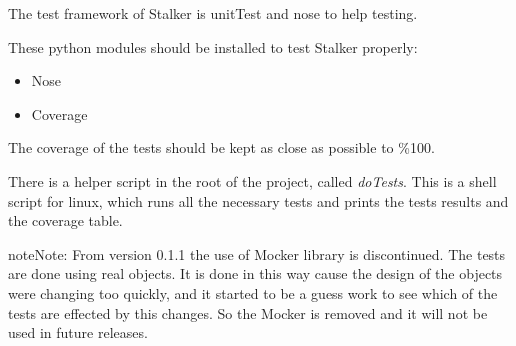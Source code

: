 \documentclass[a4paper,10pt,english]{sphinxmanual}
\begin{document}
The test framework of Stalker is unitTest and nose to help testing.

These python modules should be installed to test Stalker properly:
\begin{itemize}
\item {} 
Nose

\item {} 
Coverage

\end{itemize}

The coverage of the tests should be kept as close as possible to \%100.

There is a helper script in the root of the project, called \emph{doTests}. This is
a shell script for linux, which runs all the necessary tests and prints the
tests results and the coverage table.

\begin{notice}{note}{Note:}
From version 0.1.1 the use of Mocker library is discontinued. The tests are
done using real objects. It is done in this way cause the design of the
objects were changing too quickly, and it started to be a guess work to see
which of the tests are effected by this changes. So the Mocker is removed and
it will not be used in future releases.
\end{notice}
\end{document}

